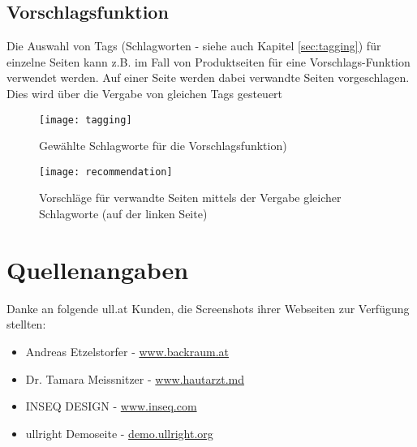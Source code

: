 \documentclass[article, a4paper, oneside, 11pt]{memoir}
\begin{document}
\section{Vorschlagsfunktion}
\label{sec:recommendation}

Die Auswahl von Tags (Schlagworten - siehe auch Kapitel \vref{sec:tagging}) für einzelne Seiten kann z.B. im Fall von Produktseiten für eine Vorschlags-Funktion verwendet werden. Auf einer Seite werden dabei verwandte Seiten vorgeschlagen. Dies wird über die Vergabe von gleichen Tags gesteuert

\begin{figure}[htp]
\centering
\texttt{[image: tagging]}
\caption{Gewählte Schlagworte für die Vorschlagsfunktion)}
\label{fig:tagging2}
\end{figure}

\begin{figure}[htp]
\centering
\texttt{[image: recommendation]}
\caption{Vorschläge für verwandte Seiten mittels der Vergabe gleicher Schlagworte (auf der linken Seite)}
\label{fig:recommendation}
\end{figure}



\chapter{Quellenangaben}

Danke an folgende ull.at Kunden, die Screenshots ihrer Webseiten zur Verfügung stellten:

\begin{itemize}
\item Andreas Etzelstorfer - \href{http://www.backraum.at}{www.backraum.at}
\item Dr. Tamara Meissnitzer - \href{http://www.hautarzt.md}{www.hautarzt.md}
\item INSEQ DESIGN - \href{http://www.inseq.com}{www.inseq.com}
\item ullright Demoseite - \href{http://demo.ullright.org}{demo.ullright.org}
\end{itemize}
\end{document}
